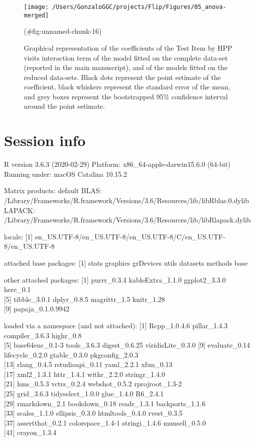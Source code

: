 \begin{appendix}
\begin{figure}
\texttt{[image: /Users/GonzaloGGC/projects/Flip/Figures/05\_anova-merged]} \caption{Graphical representation of the coefficients of the Test Item by HPP visits interaction term of the model fitted on the complete data-set (reported in the main manuscript), and of the models fitted on the reduced data-sets. Black dots represent the point estimate of the coefficient, black whiskers represent the standard error of the mean, and grey boxes represent the bootstrapped 95\% confidence interval around the point estimate.}(\#fig:unnamed-chunk-16)
\end{figure}

\hypertarget{session-info}{%
\section{Session info}\label{session-info}}

R version 3.6.3 (2020-02-29) Platform: x86\_64-apple-darwin15.6.0
(64-bit) Running under: macOS Catalina 10.15.2

Matrix products: default BLAS:
/Library/Frameworks/R.framework/Versions/3.6/Resources/lib/libRblas.0.dylib
LAPACK:
/Library/Frameworks/R.framework/Versions/3.6/Resources/lib/libRlapack.dylib

locale: {[}1{]}
en\_US.UTF-8/en\_US.UTF-8/en\_US.UTF-8/C/en\_US.UTF-8/en\_US.UTF-8

attached base packages: {[}1{]} stats graphics grDevices utils datasets
methods base

other attached packages: {[}1{]} purrr\_0.3.4 kableExtra\_1.1.0
ggplot2\_3.3.0 here\_0.1\\
{[}5{]} tibble\_3.0.1 dplyr\_0.8.5 magrittr\_1.5 knitr\_1.28\\
{[}9{]} papaja\_0.1.0.9942

loaded via a namespace (and not attached): {[}1{]} Rcpp\_1.0.4.6
pillar\_1.4.3 compiler\_3.6.3 highr\_0.8\\
{[}5{]} base64enc\_0.1-3 tools\_3.6.3 digest\_0.6.25 viridisLite\_0.3.0
{[}9{]} evaluate\_0.14 lifecycle\_0.2.0 gtable\_0.3.0 pkgconfig\_2.0.3\\
{[}13{]} rlang\_0.4.5 rstudioapi\_0.11 yaml\_2.2.1 xfun\_0.13\\
{[}17{]} xml2\_1.3.1 httr\_1.4.1 withr\_2.2.0 stringr\_1.4.0\\
{[}21{]} hms\_0.5.3 vctrs\_0.2.4 webshot\_0.5.2 rprojroot\_1.3-2\\
{[}25{]} grid\_3.6.3 tidyselect\_1.0.0 glue\_1.4.0 R6\_2.4.1\\
{[}29{]} rmarkdown\_2.1 bookdown\_0.18 readr\_1.3.1 backports\_1.1.6\\
{[}33{]} scales\_1.1.0 ellipsis\_0.3.0 htmltools\_0.4.0 rvest\_0.3.5\\
{[}37{]} assertthat\_0.2.1 colorspace\_1.4-1 stringi\_1.4.6
munsell\_0.5.0\\
{[}41{]} crayon\_1.3.4


\end{appendix}
